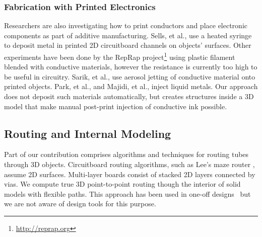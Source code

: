 \subsubsection{Fabrication with Printed Electronics}
Researchers are also investigating how to print conductors and place electronic components as part of additive manufacturing.  Sells, et al., \cite{Sells-reprap} use a heated syringe to deposit metal in printed 2D circuitboard channels on objects' surfaces.  Other experiments have been done by the RepRap project\footnote{\url{http://reprap.org}} using plastic filament blended with conductive materials, however the resistance is currently too high to be useful in circuitry.  Sarik, et al., \cite{Sarik-tracebrush} use aerosol jetting of conductive material onto printed objects.  Park, et al., \cite{Park-microchannels} and Majidi, et al., \cite{Majidi-curvature} inject liquid metals.   Our approach does not deposit such materials automatically, but creates structures inside a 3D model that make manual post-print injection of conductive ink possible.

\subsection{Routing and Internal Modeling}
Part of our contribution comprises algorithms and techniques for routing tubes through 3D objects.
Circuitboard routing algorithms, such as Lee's maze router \cite{Lee-maze}, assume 2D surfaces. Multi-layer boards consist of stacked 2D layers connected by vias. We compute true 3D point-to-point routing though the interior of solid models with flexible paths. This approach has been used in one-off designs~\cite{Navarrette-gps} but we are not aware of design tools for this purpose.


